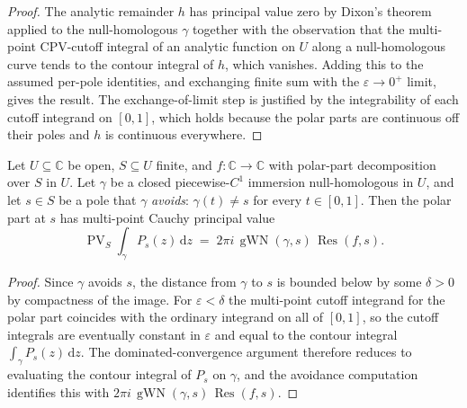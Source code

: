 \begin{proof}
  \leanok
  The analytic remainder $h$ has principal value zero by Dixon's
  theorem applied to the null-homologous $\gamma$ together with the
  observation that the multi-point CPV-cutoff integral of an analytic
  function on $U$ along a null-homologous curve tends to the contour
  integral of $h$, which vanishes. Adding this to the assumed
  per-pole identities, and exchanging finite sum with the
  $\varepsilon \to 0^{+}$ limit, gives the result. The
  exchange-of-limit step is justified by the integrability of each
  cutoff integrand on $[0,1]$, which holds because the polar parts
  are continuous off their poles and $h$ is continuous everywhere.
\end{proof}

\begin{theorem}
  \label{thm:cpv-polar-uncrossed}
  \leanok
  Let $U \subseteq \mathbb{C}$ be open, $S \subseteq U$ finite, and
  $f : \mathbb{C} \to \mathbb{C}$ with polar-part decomposition over
  $S$ in $U$. Let $\gamma$ be a closed piecewise-$C^{1}$
  immersion null-homologous in $U$, and let $s \in S$ be a pole that
  $\gamma$ \emph{avoids}: $\gamma(t) \ne s$ for every $t \in [0,1]$.
  Then the polar part at $s$ has multi-point Cauchy principal value
  \[
    \operatorname{PV}_S\!\!\int_\gamma P_s(z)\,\mathrm{d}z
    \;=\; 2 \pi i \, \operatorname{gWN}(\gamma, s) \,
      \operatorname{Res}(f, s).
  \]
\end{theorem}

\begin{proof}
  \leanok
  Since $\gamma$ avoids $s$, the distance from $\gamma$ to $s$ is
  bounded below by some $\delta > 0$ by compactness of the image.
  For $\varepsilon < \delta$ the multi-point cutoff integrand for the
  polar part coincides with the ordinary integrand on all of $[0,1]$,
  so the cutoff integrals are eventually constant in $\varepsilon$
  and equal to the contour integral
  $\int_\gamma P_s(z)\,\mathrm{d}z$. The dominated-convergence
  argument therefore reduces to evaluating the contour integral of
  $P_s$ on $\gamma$, and the avoidance computation identifies this
  with $2\pi i \, \operatorname{gWN}(\gamma, s) \, \operatorname{Res}(f, s)$.
\end{proof}

